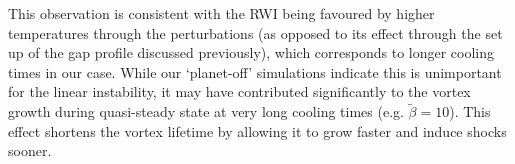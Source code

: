 This observation is consistent with the RWI being favoured by 
higher temperatures \citep{li00,lin12c} through the perturbations 
(as opposed to its effect through the set up of the gap profile
discussed previously),
which corresponds to longer cooling times in our case. 
While our `planet-off' simulations indicate this is unimportant for
the linear instability, it may have contributed  
significantly to the vortex growth during quasi-steady state at very
long cooling times (e.g. $\tilde{\beta}=10$). This effect shortens the
vortex lifetime by allowing it to grow faster and induce shocks
sooner.  

%
